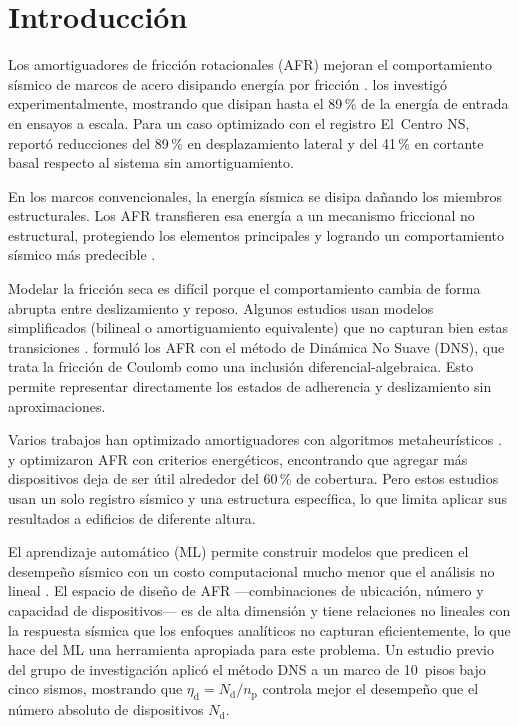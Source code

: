 \documentclass[preprint,12pt,authoryear]{elsarticle}
\newcommand{\nd}{N_{\mathrm{d}}}
\newcommand{\np}{n_{\mathrm{p}}}
\newcommand{\etad}{\eta_{\mathrm{d}}}
\begin{document}
\section{Introducción}
\label{sec:intro}

Los amortiguadores de fricción rotacionales (AFR) mejoran el comportamiento sísmico de marcos 
de acero disipando energía por fricción \citep{pall_friction_1980, pall_response_1982, 
jaisee_state---art_2021}. \citet{Mualla2002} los investigó experimentalmente, mostrando que 
disipan hasta el 89\,\% de la energía de entrada en ensayos a escala. Para un caso optimizado 
con el registro El~Centro NS, reportó reducciones del 89\,\% en desplazamiento lateral y del 
41\,\% en cortante basal respecto al sistema sin amortiguamiento.

En los marcos convencionales, la energía sísmica se disipa dañando los miembros estructurales. 
Los AFR transfieren esa energía a un mecanismo friccional no estructural, protegiendo los 
elementos principales y logrando un comportamiento sísmico más predecible 
\citep{de_domenico_editorial_2020}.

Modelar la fricción seca es difícil porque el comportamiento cambia de forma abrupta entre 
deslizamiento y reposo. Algunos estudios usan modelos simplificados (bilineal o amortiguamiento 
equivalente) que no capturan bien estas transiciones \citep{lee_seismic_2025, Jarrahi2020jbe}. 
\citet{Namorado2024} formuló los AFR con el método de Dinámica No Suave (DNS), que trata la 
fricción de Coulomb como una inclusión diferencial-algebraica. Esto permite representar 
directamente los estados de adherencia y deslizamiento sin aproximaciones.

Varios trabajos han optimizado amortiguadores con algoritmos metaheurísticos 
\citep{moreschi_design_2003, moghaddam_optimal_2022, miguel_simultaneous_2016,
ontiveros-perez_reliability-based_2019}. \citet{Jarrahi2020jbe} y \citet{Jarrahi2020sdee} 
optimizaron AFR con criterios energéticos, encontrando que agregar más dispositivos deja de 
ser útil alrededor del 60\,\% de cobertura. Pero estos estudios usan un solo registro sísmico 
y una estructura específica, lo que limita aplicar sus resultados a edificios de diferente altura.

El aprendizaje automático (ML) permite construir modelos que predicen el desempeño sísmico con 
un costo computacional mucho menor que el análisis no lineal \citep{Kazemi2022}. El espacio de 
diseño de AFR ---combinaciones de ubicación, número y capacidad de dispositivos--- es de alta 
dimensión y tiene relaciones no lineales con la respuesta sísmica que los enfoques analíticos 
no capturan eficientemente, lo que hace del ML una herramienta apropiada para este problema. 
Un estudio previo del grupo de investigación \citep{Ponce2026} aplicó el método DNS a un marco 
de 10~pisos bajo cinco sismos, mostrando que $\etad = \nd/\np$ controla mejor el desempeño 
que el número absoluto de dispositivos $\nd$.
\end{document}
